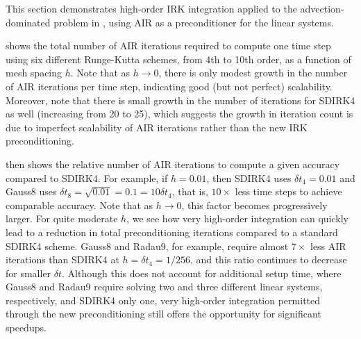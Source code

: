 \documentclass[review]{siamart}
\begin{document}
This section demonstrates high-order IRK integration applied to the advection-dominated
problem in , using AIR as a preconditioner for the linear
systems.

 shows the total number of AIR iterations required to
compute one time step using six different Runge-Kutta schemes, from 4th
to 10th order, as a function of mesh spacing $h$. Note that as $h\to 0$,
there is only modest growth in the number of AIR iterations per time step,
indicating good (but not perfect) scalability.
Moreover, note that there is small growth in the number of iterations for
SDIRK4 as well (increasing from 20 to 25), which suggests the growth in
iteration count is due to imperfect scalability of AIR iterations rather
than the new IRK preconditioning.

 then shows the relative number of AIR iterations to
compute a given accuracy compared to SDIRK4. For example, if $h=0.01$,
then SDIRK4 uses $\delta t_4 = 0.01$ and Gauss8 uses $\delta t_8 =
\sqrt{0.01} = 0.1 = 10\delta t_4$, that is, $10\times$ less time steps to
achieve comparable accuracy. Note that as $h\to 0$, this factor becomes progressively
larger. For quite moderate $h$, we see how very high-order integration
can quickly lead to a reduction in total preconditioning iterations compared to a
standard SDIRK4 scheme. Gauss8 and Radau9, for example, require almost
$7\times$ less AIR iterations than SDIRK4 at $h =\delta t_4 = 1/256$,
and this ratio continues to decrease for smaller $\delta t$. Although this
does not account for additional setup time, where Gauss8 and Radau9 require
solving two and three different linear systems, respectively, and SDIRK4
only one, very high-order
integration permitted through the new preconditioning still offers the
opportunity for significant speedups.
\end{document}
